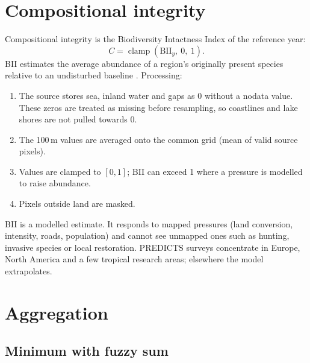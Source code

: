 \documentclass[11pt,a4paper]{article}
\newcommand{\BII}{\mathrm{BII}}
\DeclareMathOperator{\clamp}{clamp}
\begin{document}
\section{Compositional integrity}
\label{sec:compositional}

Compositional integrity is the Biodiversity Intactness Index of the reference year:
\begin{equation}
C = \clamp(\BII_y,\ 0,\ 1).
\end{equation}
BII estimates the average abundance of a region's originally present species relative to an
undisturbed baseline \citep{scholes2005}. Processing:

\begin{enumerate}
\item The source stores sea, inland water and gaps as 0 without a nodata value. These zeros are
treated as missing before resampling, so coastlines and lake shores are not pulled towards 0.
\item The 100\,m values are averaged onto the common grid (mean of valid source pixels).
\item Values are clamped to $[0,1]$; BII can exceed 1 where a pressure is modelled to raise
abundance.
\item Pixels outside land are masked.
\end{enumerate}

BII is a modelled estimate. It responds to mapped pressures (land conversion, intensity, roads,
population) and cannot see unmapped ones such as hunting, invasive species or local restoration.
PREDICTS surveys concentrate in Europe, North America and a few tropical research areas;
elsewhere the model extrapolates.

\section{Aggregation}
\label{sec:aggregation}

\subsection{Minimum with fuzzy sum}
\end{document}
